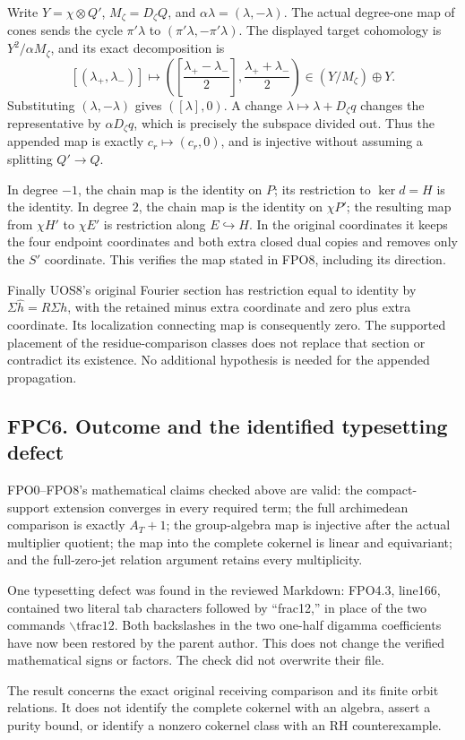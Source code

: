 Write \(Y=\chi\otimes Q'\), \(M_\zeta=D_\zeta Q\), and
\(\alpha\lambda=(\lambda,-\lambda)\). The actual degree-one map of cones
sends the cycle \(\pi'\lambda\) to \((\pi'\lambda,-\pi'\lambda)\). The
displayed target cohomology is \(Y^2/\alpha M_\zeta\), and its exact
decomposition is \[
[(\lambda_+,\lambda_-)]\longmapsto
\left(\left[\frac{\lambda_+-\lambda_-}{2}\right],
\frac{\lambda_++\lambda_-}{2}\right)
\in (Y/M_\zeta)\oplus Y.
\] Substituting \((\lambda,-\lambda)\) gives \(([\lambda],0)\). A change
\(\lambda\mapsto\lambda+D_\zeta q\) changes the representative by
\(\alpha D_\zeta q\), which is precisely the subspace divided out. Thus
the appended map is exactly \(c_r\mapsto(c_r,0)\), and is injective
without assuming a splitting \(Q'\to Q\).

In degree \(-1\), the chain map is the identity on \(P\); its
restriction to \(\ker d=H\) is the identity. In degree \(2\), the chain
map is the identity on \(\chi P'\); the resulting map from \(\chi H'\)
to \(\chi E'\) is restriction along \(E\hookrightarrow H\). In the
original coordinates it keeps the four endpoint coordinates and both
extra closed dual copies and removes only the \(S'\) coordinate. This
verifies the map stated in FPO8, including its direction.

Finally UOS8's original Fourier section has restriction equal to
identity by \(\Sigma\widehat h=R\Sigma h\), with the retained minus
extra coordinate and zero plus extra coordinate. Its localization
connecting map is consequently zero. The supported placement of the
residue-comparison classes does not replace that section or contradict
its existence. No additional hypothesis is needed for the appended
propagation.

\subsection{FPC6. Outcome and the identified typesetting
defect}\label{fpc6.-outcome-and-the-identified-typesetting-defect}

FPO0--FPO8's mathematical claims checked above are valid: the
compact-support extension converges in every required term; the full
archimedean comparison is exactly \(A_T+1\); the group-algebra map is
injective after the actual multiplier quotient; the map into the
complete cokernel is linear and equivariant; and the full-zero-jet
relation argument retains every multiplicity.

One typesetting defect was found in the reviewed Markdown: FPO4.3,
line166, contained two literal tab characters followed by ``frac12,'' in
place of the two commands \(\backslash\mathrm{tfrac}12\). Both
backslashes in the two one-half digamma coefficients have now been
restored by the parent author. This does not change the verified
mathematical signs or factors. The check did not overwrite their file.

The result concerns the exact original receiving comparison and its
finite orbit relations. It does not identify the complete cokernel with
an algebra, assert a purity bound, or identify a nonzero cokernel class
with an RH counterexample.
